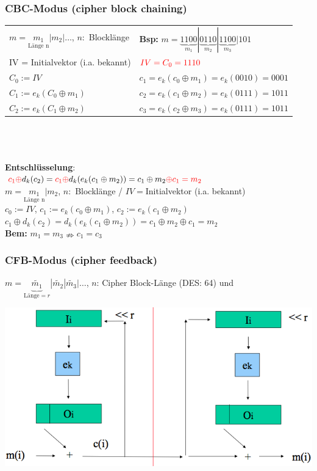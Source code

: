 \documentclass[landscape,twocolumn,a4paper]{article}
\newcommand{\Bold}[1]{\textbf{#1}} %
\newcommand{\T}[1]{\text{#1}} %
\newcommand{\Unten}[2]{\underset{#1}{#2}} %
\begin{document}
\subsubsection{CBC-Modus (cipher block chaining)}
\begin{tabular}{p{7.5cm}  l}
	$m=\Unten{\T{Länge n}}{m_1}|m_2|\dots$, $n:$ Blocklänge &\Bold{Bsp:} $m=\underbrace{1100}_{m_1} | \underbrace{0110}_{m_2} | \underbrace{1100}_{m_3} | 101$ \\
	{\color{red}IV = Initialvektor} (i.a. bekannt) &  $\color{red}IV=C_0=1110$  \\
	$C_0 := IV$ & $c_1 = e_k(c_0 \oplus m_1) = e_k(0010) = 0001$ \\
	$C_1 := e_k(C_0 \oplus m_1)$ & $c_2 = e_k(c_1 \oplus m_2) = e_k(0111) = 1011$ \\
	$C_2 := e_k(C_1 \oplus m_2)$  & $c_3 = e_k(c_2 \oplus m_3) = e_k(0111) = 1011$ \\
\end{tabular} \\ \\ \\
 \textbf{Entschlüsselung}:  \\
 ${\color{red}c_1\oplus} d_k(c_2)={\color{red}c_1\oplus}d_k(e_k(c_1\oplus m_2))= c_1\oplus m_2 {\color{red}\oplus c_1 = m_2}$ \\
 $m=\Unten{\T{Länge n}}{m_1}|m_2$, $n:$ Blocklänge / $IV=$Initialvektor (i.a. bekannt)\\
 $c_0:=IV$, $c_1:=e_k(c_0\oplus m_1)$, $c_2:=e_k(c_1\oplus m_2)$\\
 $c_1\oplus d_k(c_2)=d_k(e_k(c_1\oplus m_2))=c_1\oplus m_2\oplus c_1=m_2$\\

 \Bold{Bem:} $m_1=m_3\nRightarrow c_1=c_3$
 
\subsubsection{CFB-Modus (cipher feedback)}
 $m=\underbrace{\tilde{m_1}}_{\T{Länge}=r}|\tilde{m_2}|\tilde{m_3}|\dots$, $n$: Cipher Block-Länge (DES: 64) und 
\begin{center}
\includegraphics[scale=0.225]{cfb-encryption.png}
\end{center}
\end{document}
